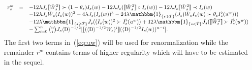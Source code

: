 \documentclass[11pt]{article}
\newcommand{\mathD}{\mathrm{D}}
\begin{document}
\begin{equation}
  \begin{array}{lll}
    r_s^w & = & - 12 \lambda J_s \llbracket \tilde{W}_s^2 \rrbracket \succ (1
    - \theta_s) I_s (w) - 12 \lambda J_s (\llbracket \tilde{W}_s^2 \rrbracket
    \circ I_s (w)) - 12 \lambda J_s \llbracket \tilde{W}_s^2 \rrbracket \prec
    I_s (w)\\
    &  & - 12 \lambda J_s \tilde{W}_s (I_s (w))^2 - 4 \lambda J_s (I_s (w))^3
    - 24 \lambda \mathbbm{1}_{\{ s \geqslant \bar{T} \}} (J_s (\tilde{W}_s I_s
    (w) \succ \theta_s I^{\flat}_s (u^w)))\\
    &  & - 12 \lambda \mathbbm{1}_{\{ s \geqslant \bar{T} \}} J_s ((I_s
    (w))^2 \succ I^{\flat}_s (u^w)) + 12 \lambda \mathbbm{1}_{\{ s < \bar{T}
    \}} J_s (\llbracket \tilde{W}_s^2 \rrbracket \succ I_s^{\flat} (u^w))\\
    &  & - \sum_{i = 0}^n \binom{n}{i} J_s \langle \mathD \rangle^{- 1 / 2}
    [\llbracket (\langle \mathD \rangle^{- 1 / 2} W_s)^i \rrbracket (\langle
    \mathD \rangle^{- 1 / 2} I_s (w))^{n - i}_{}] .
  \end{array} \label{eq:rw}
\end{equation}
The first two terms in~(\ref{eq:uw}) will be used for renormalization while
the remainder $r^w$ contains terms of higher regularity which will have to be
estimated in the sequel.
\end{document}

